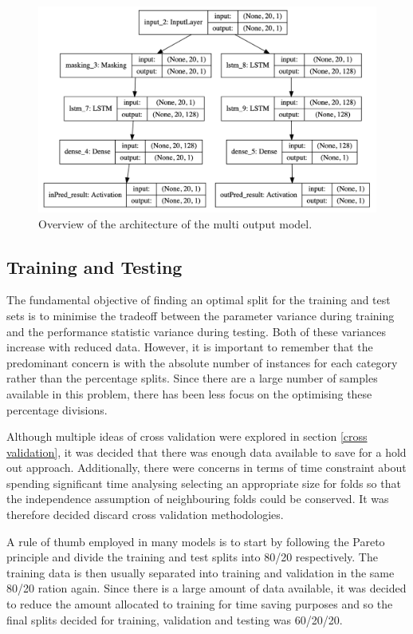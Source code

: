 \documentclass[10pt,onecolumn,letterpaper]{article}
\begin{document}
\begin{figure}[!hbt!]
\centering
\includegraphics[width=14.5cm]{multi_output.png}
\caption{Overview of the architecture of the multi output model.}
\end{figure}

\subsection{Training and Testing} 

The fundamental objective of finding an optimal split for the training and test sets is to minimise the tradeoff between the parameter variance during training and the performance statistic variance during testing. Both of these variances increase with reduced data. However, it is important to remember that the predominant concern is with the absolute number of instances for each category rather than the percentage splits. Since there are a large number of samples available in this problem, there has been less focus on the optimising these percentage divisions. 

Although multiple ideas of cross validation were explored in section \ref{cross validation}, it was decided that there was enough data available to save for a hold out approach. Additionally, there were concerns in terms of time constraint about spending significant time analysing selecting an appropriate size for folds so that the independence assumption of neighbouring folds could be conserved. It was therefore decided discard cross validation methodologies.

A rule of thumb employed in many models is to start by following the Pareto principle and divide the training and test splits into 80/20 respectively. The training data is then usually separated into training and validation in the same 80/20 ration again. Since there is a large amount of data available, it was decided to reduce the amount allocated to training for time saving purposes and so the final splits decided for training, validation and testing was 60/20/20.
\end{document}
